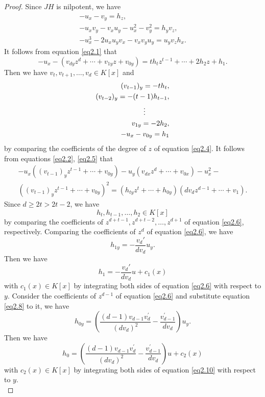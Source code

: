 \documentclass[12pt, twoside, leqno]{article}
\theoremstyle{definition}
\numberwithin{equation}{section}
\begin{document}
\begin{proof}
Since $JH$ is nilpotent, we have
\begin{eqnarray}
-u_{x}-v_{y}=h_{z},\label{eq2.1}\\
-u_{x}v_{y}-v_{x}u_{y}-u_{x}^{2}-v_{y}^{2}=h_{y}v_{z},\label{eq2.2}\\
-u_{x}^{3}-2u_{x}u_{y}v_{x}-v_{x}v_{y}u_{y}=u_{y}v_{z}h_{x}.\label{eq2.3}
\end{eqnarray}
It follows from equation \eqref{eq2.1} that
\begin{equation}\label{eq2.4}
-u_{x}-(v_{dy}z^{d}+\cdots+v_{1y}z+v_{0y})=th_{t}z^{t-1}+\cdots+2h_{2}z+h_{1}.
\end{equation}
Then we have $v_t,v_{t+1},\ldots,v_d\in K[x]$ and
\begin{eqnarray}
(v_{t-1})_y=-th_{t},\notag\\
	(v_{t-2})_y=-(t-1)h_{t-1},\notag\\
	\vdots~~~~~~~~~~\label{eq2.5}\\
	v_{1y}=-2h_{2},\notag\\
	-u_{x}-v_{0y}=h_{1}\notag
\end{eqnarray}
by comparing the coefficients of the degree of $z$ of equation \eqref{eq2.4}. It follows from equations \eqref{eq2.2}, \eqref{eq2.5} that
\begin{equation}\label{eq2.6}
\begin{split}
-u_{x}((v_{t-1})_yz^{t-1}+\cdots+v_{0y})-u_{y}(v_{dx}z^{d}+\cdots+v_{0x})-u_{x}^{2}-\\( (v_{t-1})_yz^{t-1}+\cdots+v_{0y}) ^{2}
=(h_{ty}z^{t}+\cdots+h_{0y})( dv_{d}z^{d-1}+\cdots+v_{1}).
\end{split}
\end{equation}
Since $d\geq 2t>2t-2$, we have
\begin{equation}\label{eq2.7}
h_t,h_{t-1},\ldots,h_2\in K[x]
\end{equation}
by comparing the coefficients of $z^{d+t-1}, z^{d+t-2},\ldots,z^{d+1}$ of equation \eqref{eq2.6}, respectively. Comparing the coefficients of $z^d$ of equation \eqref{eq2.6}, we have
\begin{equation}\label{eq2.8}
h_{1y}=-\frac{v_d'}{dv_d}u_y.
\end{equation}
Then we have
\begin{equation}\label{eq2.9}
h_1=-\frac{v_d'}{dv_d}u+c_1(x)
\end{equation}
with $c_1(x)\in K[x]$ by integrating both sides of equation \eqref{eq2.6} with respect to $y$. Consider the coefficients of $z^{d-1}$ of equation \eqref{eq2.6} and substitute equation \eqref{eq2.8} to it, we have
\begin{equation}\label{eq2.10}
h_{0y}=\left( \frac{(d-1)v_{d-1}v_{d}^{'}}{(dv_{d})^{2}}-\frac{v_{d-1}^{'}}{dv_{d}}\right) u_{y}.
\end{equation}
Then we have
\begin{equation}\label{eq2.11}
h_{0}=\left( \frac{(d-1)v_{d-1}v_{d}^{'}}{(dv_{d})^{2}}-\frac{v_{d-1}^{'}}{dv_{d}}\right) u+c_{2}(x)
\end{equation}
with $c_2(x)\in K[x]$ by integrating both sides of equation \eqref{eq2.10} with respect to $y$.\\


\end{proof}
\end{document}
